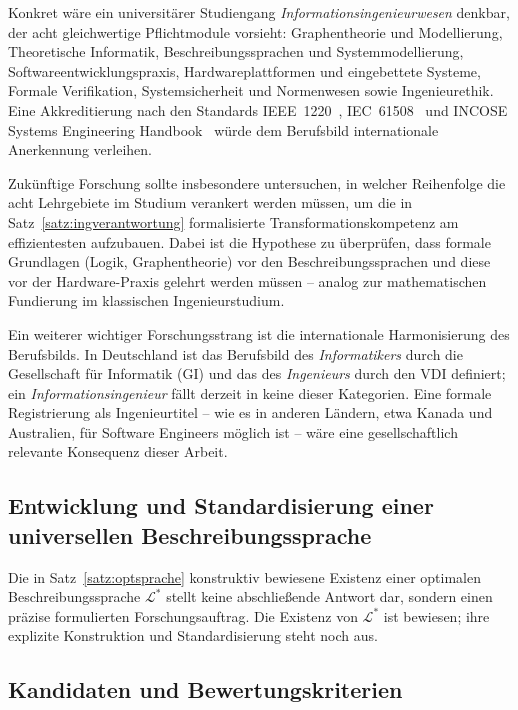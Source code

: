 ﻿\documentclass[a4paper,12pt]{report}
\theoremstyle{definition}
\begin{document}
Konkret wäre ein universitärer Studiengang \emph{Informationsingenieurwesen} denkbar,
der acht gleichwertige Pflichtmodule vorsieht: Graphentheorie und Modellierung,
Theoretische Informatik, Beschreibungssprachen und Systemmodellierung,
Softwareentwicklungspraxis, Hardwareplattformen und eingebettete Systeme,
Formale Verifikation, Systemsicherheit und Normenwesen sowie Ingenieurethik.
Eine Akkreditierung nach den Standards IEEE~1220~\cite{ieee2021}, IEC~61508~\cite{iec61508}
und INCOSE Systems Engineering Handbook~\cite{incose2015} würde dem Berufsbild
internationale Anerkennung verleihen.

Zukünftige Forschung sollte insbesondere untersuchen, in welcher Reihenfolge die acht
Lehrgebiete im Studium verankert werden müssen, um die in Satz~\ref{satz:ingverantwortung}
formalisierte Transformationskompetenz am effizientesten aufzubauen. Dabei ist die
Hypothese zu überprüfen, dass formale Grundlagen (Logik, Graphentheorie) vor den
Beschreibungssprachen und diese vor der Hardware-Praxis gelehrt werden müssen --
analog zur mathematischen Fundierung im klassischen Ingenieurstudium.

Ein weiterer wichtiger Forschungsstrang ist die internationale Harmonisierung des
Berufsbilds. In Deutschland ist das Berufsbild des \emph{Informatikers} durch die
Gesellschaft für Informatik (GI) und das des \emph{Ingenieurs} durch den VDI
definiert; ein \emph{Informationsingenieur} fällt derzeit in keine dieser Kategorien.
Eine formale Registrierung als Ingenieurtitel -- wie es in anderen Ländern, etwa
Kanada und Australien, für Software Engineers möglich ist -- wäre eine gesellschaftlich
relevante Konsequenz dieser Arbeit.

\subsection{Entwicklung und Standardisierung einer universellen Beschreibungssprache}

Die in Satz~\ref{satz:optsprache} konstruktiv bewiesene Existenz einer optimalen
Beschreibungssprache $\mathcal{L}^*$ stellt keine abschließende Antwort dar, sondern
einen präzise formulierten Forschungsauftrag. Die Existenz von $\mathcal{L}^*$ ist
bewiesen; ihre explizite Konstruktion und Standardisierung steht noch aus.

\subsection{Kandidaten und Bewertungskriterien}
\end{document}
